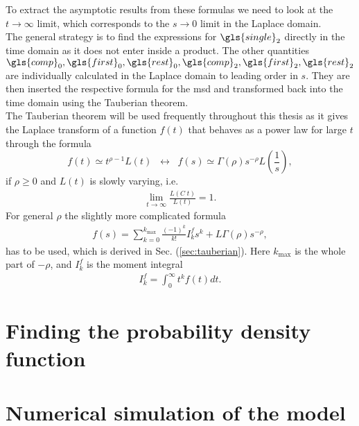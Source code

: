 To extract the asymptotic results from these formulas we need to look at the $t \to \infty$ limit, which corresponds to the $s \to 0$ limit in the Laplace domain. \\
The general strategy is to find the expressions for $\gls{single}_2$ directly in the time domain as it does not enter inside a product. The other quantities $\gls{comp}_0, \gls{first}_0, \gls{rest}_0, \gls{comp}_2, \gls{first}_2, \gls{rest}_2$ are individually calculated in the Laplace domain to leading order in $s$. They are then inserted the respective formula for the \gls{msd} and transformed back into the time domain using the Tauberian theorem. \\
The Tauberian theorem will be used frequently throughout this thesis as it gives the Laplace transform of a function $f(t)$ that behaves as a power law for large $t$ through the formula
% 
\begin{equation}
 f(t) \simeq t^{\rho-1} L(t) \;\; \leftrightarrow \;\; f(s) \simeq \Gamma(\rho) s^{-\rho} L\left(\frac{1}{s}\right) \label{eqn:tauberian} ,
\end{equation}
%
if $\rho \geq 0 $ and $L(t)$ is slowly varying, i.e.
%
\begin{align}
\lim_{t \to \infty} \frac{L(C \; t)}{L(t)} = 1 .
\end{align}
%
For general $\rho$ the slightly more complicated formula 
%
\begin{align}
 f(s) = \sum_{k=0}^{k_{\max}} \frac{(-1)^k}{k!} I^{f}_k s^k + L \Gamma(\rho) s^{-\rho} ,
 \label{eqn:generalTauberian}
\end{align}
%
has to be used, which is derived in Sec. (\ref{sec:tauberian}). Here $k_{\max}$ is the whole part of $-\rho$, and $I^{f}_k$ is the moment integral
%
\begin{align}
I^{f}_k = \int_0^\infty t^k f(t) dt.
\end{align}



\section{Finding the probability density function}

\section{Numerical simulation of the model}

